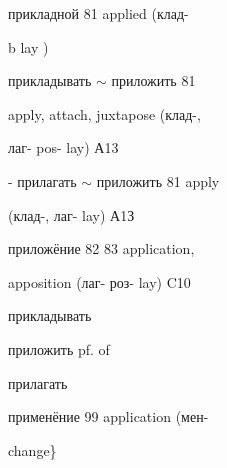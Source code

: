 \begin{minipage}[t]{0.475\textwidth}
\noindent прикладной 81 applied (клад-\par
\noindent b lay )\par
{} прикладывать $\sim$ приложить 81\par
\noindent apply, attach, juxtapose (клад-,\par
\noindent лаг- pos- lay) А13\par
\noindent - прилагать $\sim$ приложить 81 apply\par
\noindent (клад-, лаг- lay) А1З\par
\noindent приложёние 82 83 application,\par
\noindent apposition (лаг- роз- lay) C10\par
\noindent прикладывать\par
\noindent приложить pf. of\par
\noindent прилагать\par
\noindent применёние 99 application (мен-\par
\noindent change\}\par
\end{minipage}
\endgroup


